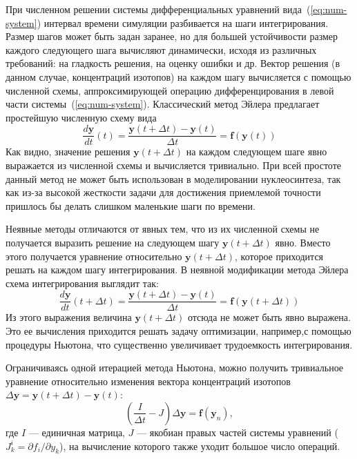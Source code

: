 При численном решении системы дифференциальных уравнений вида~(\ref{eq:num-system}) интервал времени симуляции разбивается на шаги интегрирования. Размер шагов может быть задан заранее, но для большей устойчивости размер каждого следующего шага вычисляют динамически, исходя из различных требований: на гладкость решения, на оценку ошибки и др. Вектор решения (в данном случае, концентраций изотопов) на каждом шагу вычисляется с помощью численной схемы, аппроксимирующей операцию дифференцирования в левой части системы~(\ref{eq:num-system}). Классический метод Эйлера предлагает простейшую численную схему вида
\begin{equation}
\displaystyle
\frac{d \bm{y}}{d t}(t) = 
\frac{\bm{y}(t + \Delta t) - \bm{y}(t)}{\Delta t} = \bm{f}(\bm{y}(t))
\end{equation}
Как видно, значение решения $\bm{y}(t + \Delta t)$ на каждом следующем шаге явно выражается из численной схемы и вычисляется тривиально. При всей простоте данный метод не может быть использован в моделировании нуклеосинтеза, так как из-за высокой жесткости задачи для достижения приемлемой точности пришлось бы делать слишком маленькие шаги по времени.

Неявные методы отличаются от явных тем, что из их численной схемы не получается выразить решение на следующем шагу $\bm{y}(t + \Delta t)$ явно. Вместо этого получается уравнение относительно $\bm{y}(t + \Delta t)$, которое приходится решать на каждом шагу интегрирования. В неявной модификации метода Эйлера схема интегрирования выглядит так: 
\begin{equation}
\displaystyle
\frac{d \bm{y}}{d t}(t + \Delta t) = 
\frac{\bm{y}(t + \Delta t) - \bm{y}(t)}{\Delta t} = 
\bm{f}(\bm{y}(t + \Delta t))
\end{equation}
Из этого выражения величина $\bm{y}(t + \Delta t)$ отсюда не может быть явно выражена. Это ее вычисления приходится решать задачу оптимизации, например,с помощью процедуры Ньютона, что существенно увеличивает трудоемкость интегрирования. 

Ограничиваясь одной итерацией метода Ньютона, можно получить тривиальное уравнение относительно изменения вектора концентраций изотопов $\Delta \bm{y} = \bm{y}(t + \Delta t) - \bm{y}(t)$:
\begin{equation}
\displaystyle
  \left( \frac{I}{\Delta t} - J \right) \Delta \bm{y} = \bm{f}(\bm{y}_n),
\end{equation}
где $I$ --- единичная матрица, $J$ --- якобиан правых частей системы уравнений ($J_k^i = \partial f_i/\partial y_k$), на вычисление которого также уходит большое число операций.

